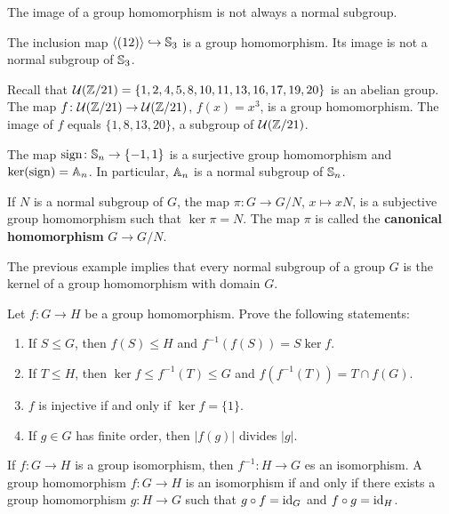 The image of a group homomorphism
is not always a normal subgroup. 

\begin{example}
The inclusion map $\langle (12)\rangle\hookrightarrow\mathbb{S}_3$ is a group
homomorphism. Its image is not a normal subgroup of $\mathbb{S}_3$.
\end{example}

\begin{example}
Recall that $\mathcal{U}(\mathbb{Z}/21)=\{1,2,4,5,8,10,11,13,16,17,19,20\}$ is an abelian group. The map 
$f\colon\mathcal{U}(\mathbb{Z}/21)\to\mathcal{U}(\mathbb{Z}/21)$, $f(x)=x^3$, is a group
homomorphism. The image of 
$f$ equals $\{1,8,13,20\}$, a subgroup of $\mathcal{U}(\mathbb{Z}/21)$.
\end{example}

\begin{example}
The map $\operatorname{sign}\colon\mathbb{S}_n\to\{-1,1\}$ is a surjective group 
homomorphism and 
$\ker(\operatorname{sign})=\mathbb{A}_n$. In particular, $\mathbb{A}_n$ is a normal subgroup of $\mathbb{S}_n$.
\end{example}

\begin{example}
If $N$ is a normal subgroup of $G$, the map $\pi\colon G\to G/N$, $x\mapsto xN$, is a subjective group homomorphism such that 
$\ker\pi=N$. The map $\pi$ is called 
the \textbf{canonical homomorphism} $G\to G/N$.
\end{example}

The previous example implies that 
every normal subgroup of a group $G$ is the kernel of a group
homomorphism with domain $G$. 


\begin{exercise}
Let $f\colon G\to H$ be a group homomorphism. 
Prove the following statements:
\begin{enumerate}
\item If $S\leq G$, then $f(S)\leq H$ and $f^{-1}(f(S))=S\ker f$.
\item If $T\leq H$, then $\ker f\leq f^{-1}(T)\leq G$ and $f(f^{-1}(T))=T\cap f(G)$.
\item $f$ is injective if and only if $\ker f=\{1\}$.
\item If $g\in G$ has finite order, then $|f(g)|$ divides $|g|$.
\end{enumerate}
\end{exercise}

If $f\colon G\to H$ is a group isomorphism, then
$f^{-1}\colon H\to G$ es an isomorphism. A group
homomorphism $f\colon G\to H$ is an isomorphism
if and only if there exists a group homomorphism 
$g\colon H\to G$ such that $g\circ f=\operatorname{id}_G$ and $f\circ g=\operatorname{id}_H$.

